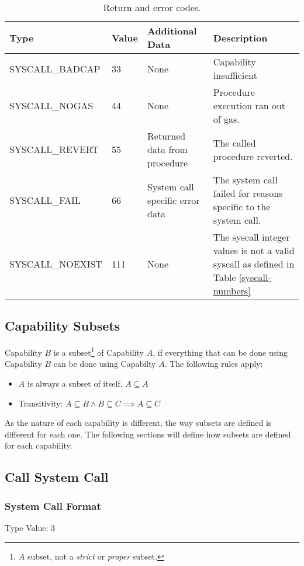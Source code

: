 \documentclass[english,a4paper]{article}
\let\oldparagraph\subsubsection
\renewcommand{\subsubsection}[1]{\oldparagraph{#1}\mbox{}}
\begin{document}
\begin{table}[H]
  \caption{Return and error codes.}
  \centering{}%
  \begin{tabular}{p{}|p{}|p{}|p{}}
    \hline
    Type & Value & Additional Data & Description\tabularnewline
    \hline
    \hline
    SYSCALL\_BADCAP  & 33 & None & Capability insufficient \tabularnewline
    SYSCALL\_NOGAS   & 44 & None & Procedure execution ran out of gas.
      \tabularnewline
    SYSCALL\_REVERT  & 55 & Returned data from procedure & The called
      procedure reverted. \tabularnewline
    SYSCALL\_FAIL    & 66 & System call specific error data & The system call
      failed for reasons specific to the system call. \tabularnewline
    SYSCALL\_NOEXIST & 111 & None & The syscall integer values is not a valid
      syscall as defined in Table \ref{syscall-numbers} \tabularnewline
    \hline
  \end{tabular}
\end{table}

\subsection{Capability Subsets}\label{cap-subsets}

Capability $B$ is a subset\footnote{$A$ subset, not a \emph{strict} or
\emph{proper} subset.} of Capability $A$, if everything that can be done using
Capability $B$ can be done using Capabilty $A$. The following rules apply:

\begin{itemize}
  \item $A$ is always a subset of itself. $A \subseteq A$
  \item Transitivity: $A \subseteq B \land B \subseteq C \implies A
  \subseteq C$
\end{itemize}

As the nature of each capability is different, the way subsets are defined is
different for each one. The following sections will define how subsets are
defined for each capability.

\subsection{Call System Call}

\subsubsection{System Call Format}
Type Value: 3
\end{document}

